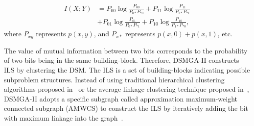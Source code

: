 \begin{equation} 
\begin{split}
I(X;Y) &= P_{00 }\log{\frac{P_{00}}{P_{0*} P_{*0}}} + P_{11 }\log{\frac{P_{11}}{P_{1*} P_{*1}}}  \\
	    &+ P_{01 }\log{\frac{P_{01}}{P_{0*} P_{*1}}} + P_{10 }\log{\frac{P_{10}}{P_{1*} P_{*0}}},  
\end{split}
\end{equation}
where $P_{xy}$ represents $p(x,y)$, and $P_{x*}$ represents $p(x,0)+p(x,1)$, etc.

The value of mutual information between two bits corresponds to the probability of two bits being in the same building-block.
Therefore, DSMGA-II constructs ILS by clustering the DSM.
The ILS is a set of building-blocks indicating possible subproblem structures.
Instead of using traditional hierarchical clustering algorithms proposed in~\cite{thierens:LTGA} or the average linkage clustering technique proposed in~\cite{thierens:OM}, DSMGA-II adopts a specific subgraph called approximation maximum-weight connected subgraph (AMWCS) to construct the ILS by iteratively adding the bit with maximum linkage into the graph~\cite{hsu:DSMGA2}.




